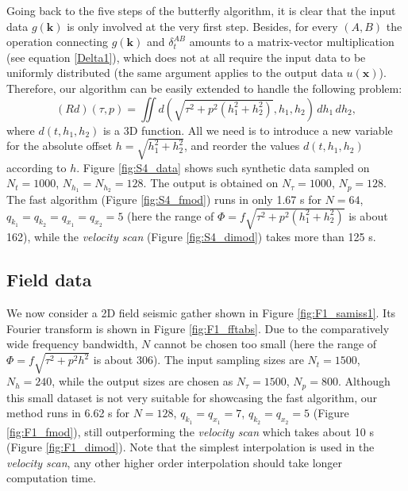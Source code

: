Going back to the five steps of the butterfly algorithm, it is clear that the input data $g(\mathbf{k})$ is only involved at the very first step. Besides, for every $(A,B)$ the operation connecting $g(\mathbf{k})$ and $\delta_t^{AB}$ amounts to a matrix-vector multiplication (see equation \ref{Delta1}), which does not at all require the input data to be uniformly distributed (the same argument applies to the output data $u(\mathbf{x})$). Therefore, our algorithm can be easily extended to handle the following problem:
\begin{equation}
(Rd)(\tau,p)=\iint d(\sqrt{\tau^2+p^2(h_1^2+h_2^2)},h_1,h_2)\,dh_1\,dh_2,
\end{equation}
where $d(t,h_1,h_2)$ is a 3D function. All we need is to introduce a new variable for the absolute offset $h=\sqrt{h_1^2+h_2^2}$, and reorder the values $d(t,h_1,h_2)$ according to $h$. Figure \ref{fig:S4_data} shows such synthetic data sampled on $N_t=1000$, $N_{h_1}=N_{h_2}=128$. The output is obtained on $N_{\tau}=1000$, $N_p=128$. The fast algorithm (Figure \ref{fig:S4_fmod}) runs in only 1.67 s for $N=64$, $q_{k_1}=q_{k_2}=q_{x_1}=q_{x_2}=5$ (here the range of $\Phi=f\sqrt{\tau^2+p^2(h_1^2+h_2^2)}$ is about 162), while the {\it velocity scan} (Figure \ref{fig:S4_dimod}) takes more than 125 s.
 







\subsection{Field data}

We now consider a 2D field seismic gather shown in Figure \ref{fig:F1_samiss1}. Its Fourier transform is shown in Figure \ref{fig:F1_fftabs}. Due to the comparatively wide frequency bandwidth, $N$ cannot be chosen too small (here the range of $\Phi=f\sqrt{\tau^2+p^2h^2}$ is about 306). The input sampling sizes are $N_t=1500$, $N_h=240$, while the output sizes are chosen as $N_{\tau}=1500$, $N_p=800$. Although this small dataset is not very suitable for showcasing the fast algorithm, our method runs in 6.62 s for $N=128$, $q_{k_1}=q_{x_1}=7$, $q_{k_2}=q_{x_2}=5$ (Figure \ref{fig:F1_fmod}), still outperforming the {\it velocity scan} which takes about 10 s (Figure \ref{fig:F1_dimod}). Note that the simplest interpolation is used in the {\it velocity scan}, any other higher order interpolation should take longer computation time.

